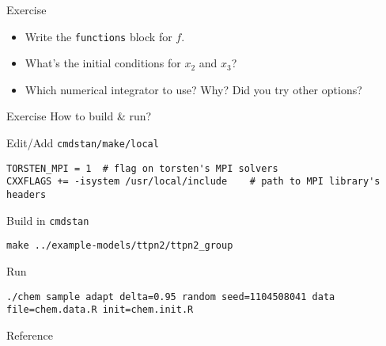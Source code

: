 \documentclass[presentation]{beamer}
\begin{document}
\begin{frame}[fragile,label={sec:org668e9bc}]{Exercise}
 \begin{itemize}
\item Write the \texttt{functions} block for \(f\).
\item What's the initial conditions for \(x_2\) and \(x_3\)?
\item Which numerical integrator to use? Why? Did you try other options?
\end{itemize}
\end{frame}

\begin{frame}[fragile,label={sec:org3550411}]{Exercise}
 How to build \& run?
\begin{block}{Edit/Add \texttt{cmdstan/make/local}}
\begin{verbatim}
TORSTEN_MPI = 1  # flag on torsten's MPI solvers
CXXFLAGS += -isystem /usr/local/include    # path to MPI library's headers
\end{verbatim}
\end{block}
\begin{block}{Build in \texttt{cmdstan}}
\begin{verbatim}
make ../example-models/ttpn2/ttpn2_group
\end{verbatim}
\end{block}
\begin{block}{Run}
\begin{verbatim}
./chem sample adapt delta=0.95 random seed=1104508041 data file=chem.data.R init=chem.init.R
\end{verbatim}
\end{block}
\end{frame}

\begin{frame}[label={sec:org2ed4bbf}]{Reference}


\end{frame}
\end{document}
